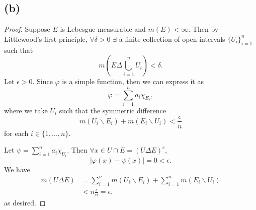 \documentclass{article}
\begin{document}
\subsection*{(b)}
\begin{proof}
	Suppose $E$ is Lebesgue measurable and $m(E) < \infty$. Then by Littlewood's first principle, $\forall \delta > 0$ $\exists$ a finite collection of open intervals $\{U_i\}_{i=1}^n$ such that
	\begin{equation}
		m\left(E \Delta \bigcup_{i=1}^n U_i\right) < \delta.
	\end{equation}
	Let $\epsilon > 0$. Since $\varphi$ is a simple function, then we can express it as
	\begin{equation}
		\varphi = \sum_{i=1}^n a_i \chi_{E_i},
	\end{equation}
	where we take $U_i$ such that the symmetric difference
	\begin{equation}
		m(U_i \backslash E_i) + m(E_i \backslash U_i) < \frac{\epsilon}{n}
	\end{equation}
	for each $i \in \{1, ..., n\}$. 
	
	Let $\psi = \sum_{i=1}^n a_i \chi_{U_i}$. Then $\forall x \in U \cap E = (U \Delta E)^c$,
	\begin{equation}
		|\varphi(x) - \psi(x)| = 0 < \epsilon.
	\end{equation}
	We have
	\begin{align}
		m(U \Delta E) &= \sum_{i=1}^n m(U_i \backslash E_i) + \sum_{i=1}^n m(E_i \backslash U_i) \\
		&< n \frac{\epsilon}{n} = \epsilon,
	\end{align}
	as desired.
\end{proof}
\end{document}

